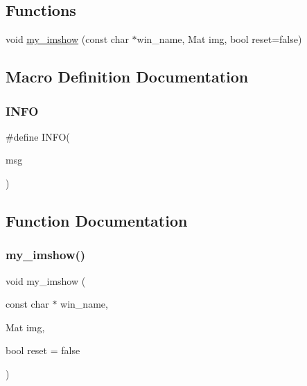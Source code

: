 \subsection*{Functions}
\begin{DoxyCompactItemize}
\item 
void \mbox{\hyperlink{utils_8hh_aabfea83501dfccfa4c420b8c19ceefd7}{my\+\_\+imshow}} (const char $\ast$win\+\_\+name, Mat img, bool reset=false)
\end{DoxyCompactItemize}


\subsection{Macro Definition Documentation}
\mbox{\label{utils_8hh_a3ae64706314066fdc8b6c8029a915aa7}} 
\subsubsection{\texorpdfstring{I\+N\+FO}{INFO}}
{\footnotesize\ttfamily \#define I\+N\+FO(\begin{DoxyParamCaption}\item[{}]{msg }\end{DoxyParamCaption})}



\subsection{Function Documentation}
\mbox{\label{utils_8hh_aabfea83501dfccfa4c420b8c19ceefd7}} 
\subsubsection{\texorpdfstring{my\+\_\+imshow()}{my\_imshow()}}
{\footnotesize\ttfamily void my\+\_\+imshow (\begin{DoxyParamCaption}\item[{const char $\ast$}]{win\+\_\+name,  }\item[{Mat}]{img,  }\item[{bool}]{reset = {\ttfamily false} }\end{DoxyParamCaption})}

